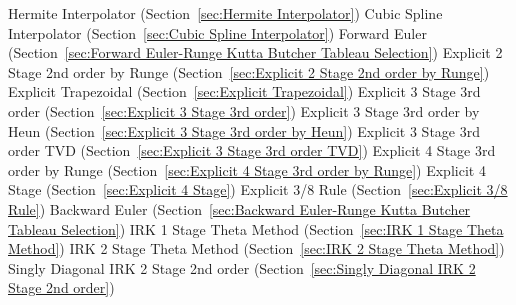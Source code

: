 \begin{list}{}
    Hermite Interpolator (Section~\ref{sec:Hermite Interpolator})
      \newline 
    Cubic Spline Interpolator (Section~\ref{sec:Cubic Spline Interpolator})
      \newline 
    Forward Euler (Section~\ref{sec:Forward Euler-Runge Kutta Butcher Tableau Selection})
      \newline 
    Explicit 2 Stage 2nd order by Runge (Section~\ref{sec:Explicit 2 Stage 2nd order by Runge})
      \newline 
    Explicit Trapezoidal (Section~\ref{sec:Explicit Trapezoidal})
      \newline 
    Explicit 3 Stage 3rd order (Section~\ref{sec:Explicit 3 Stage 3rd order})
      \newline 
    Explicit 3 Stage 3rd order by Heun (Section~\ref{sec:Explicit 3 Stage 3rd order by Heun})
      \newline 
    Explicit 3 Stage 3rd order TVD (Section~\ref{sec:Explicit 3 Stage 3rd order TVD})
      \newline 
    Explicit 4 Stage 3rd order by Runge (Section~\ref{sec:Explicit 4 Stage 3rd order by Runge})
      \newline 
    Explicit 4 Stage (Section~\ref{sec:Explicit 4 Stage})
      \newline 
    Explicit 3/8 Rule (Section~\ref{sec:Explicit 3/8 Rule})
      \newline 
    Backward Euler (Section~\ref{sec:Backward Euler-Runge Kutta Butcher Tableau Selection})
      \newline 
    IRK 1 Stage Theta Method (Section~\ref{sec:IRK 1 Stage Theta Method})
      \newline 
    IRK 2 Stage Theta Method (Section~\ref{sec:IRK 2 Stage Theta Method})
      \newline 
    Singly Diagonal IRK 2 Stage 2nd order (Section~\ref{sec:Singly Diagonal IRK 2 Stage 2nd order})

\end{list}

